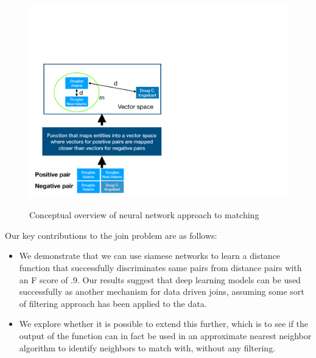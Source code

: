 \begin{figure}
\centering
\includegraphics[width=1\linewidth]{fig2}
\label{fig-1}
\caption{Conceptual overview of neural network approach to matching}
\end{figure}

Our key contributions to the join problem are as follows:
\begin{itemize}
\item We demonstrate that we can use siamese networks to learn a distance function that successfully discriminates same pairs from distance pairs with an F score of .9.  Our results suggest that deep learning models can be used successfully as another mechanism for data driven joins, assuming some sort of filtering approach has been applied to the data.
\item We explore whether it is possible to extend this further, which is to see if the output of the function can in fact be used in an approximate nearest neighbor algorithm to identify neighbors to match with, without any filtering.  
\end{itemize}

